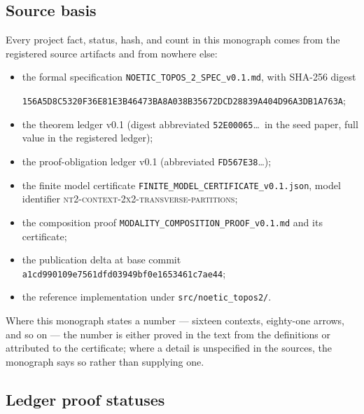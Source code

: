 \subsection{Source basis}\label{ch01:sec:sources}

Every project fact, status, hash, and count in this monograph comes from the
registered source artifacts and from nowhere else:
\begin{itemize}
\item the formal specification \texttt{NOETIC\_TOPOS\_2\_SPEC\_v0.1.md}, with
SHA-256 digest
\begin{center}
\texttt{156A5D8C5320F36E81E3B46473BA8A038B35672DCD28839A404D96A3DB1A763A};
\end{center}
\item the theorem ledger v0.1 (digest abbreviated \texttt{52E00065}\ldots\ in
the seed paper, full value in the registered ledger);
\item the proof-obligation ledger v0.1 (abbreviated \texttt{FD567E38}\ldots);
\item the finite model certificate
\texttt{FINITE\_MODEL\_CERTIFICATE\_v0.1.json}, model identifier
\textsc{nt2-context-2x2-transverse-partitions};
\item the composition proof
\texttt{MODALITY\_COMPOSITION\_PROOF\_v0.1.md} and its certificate;
\item the publication delta at base commit\\
\texttt{a1cd990109e7561dfd03949bf0e1653461c7ae44};
\item the reference implementation under \texttt{src/noetic\_topos2/}.
\end{itemize}
Where this monograph
states a number --- sixteen contexts, eighty-one arrows, and so on --- the
number is either proved in the text from the definitions or attributed to
the certificate; where a detail is unspecified in the sources, the monograph
says so rather than supplying one.

\subsection{Ledger proof statuses}\label{ch01:sec:statuses}


